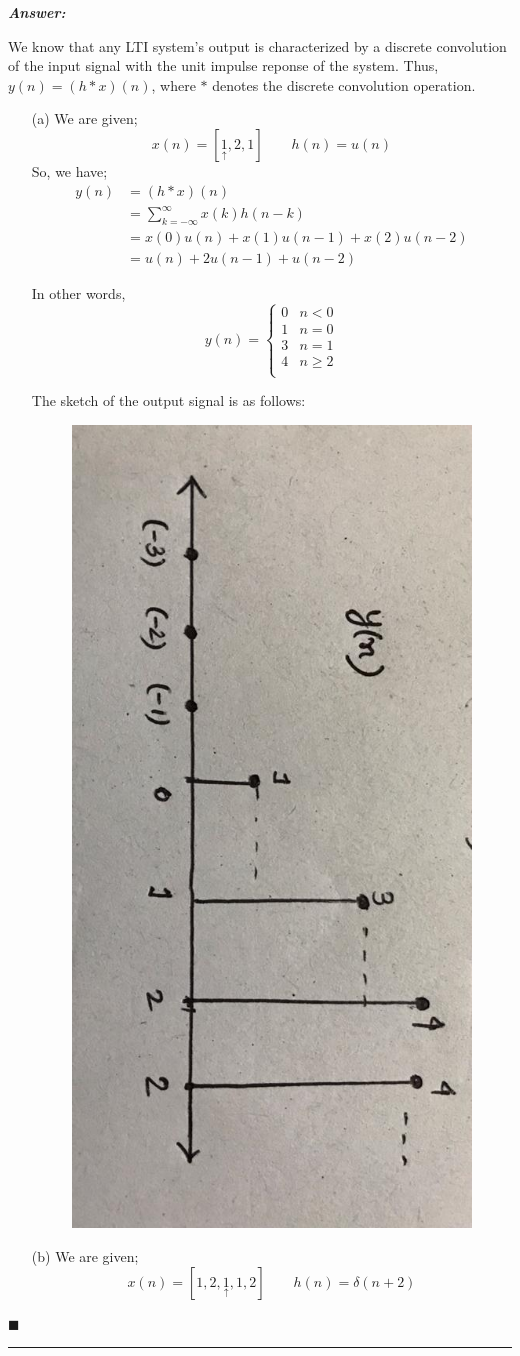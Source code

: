 \documentclass[12pt]{article}
\theoremstyle{definition}
\newenvironment{answer}{
    \textbf{\textit{Answer:}} \qquad
}{\hfill $\blacksquare$ \\ \begin{center}
    \rule{0.6\linewidth}{0.5px}    
\end{center}
}
\begin{document}
\begin{answer}
    We know that any LTI system's output is characterized by a discrete convolution of the input signal with the unit impulse reponse of the system. Thus, $y(n) = (h \ast x)(n)$, where $\ast$ denotes the discrete convolution operation.
    \begin{enumerate}
        \item[(a)] We are given;
        $$
        x(n) = [\underset{\uparrow}{1}, 2, 1] \qquad h(n) = u(n)
        $$ 
        So, we have;
        \begin{align*}
            y(n) 
            & = (h \ast x)(n) \\
            & = \sum_{k = -\infty}^{\infty} x(k)h(n-k)\\
            & = x(0)u(n) + x(1)u(n-1) + x(2)u(n-2)\\
            & = u(n) + 2u(n-1) + u(n-2)
        \end{align*} 

        In other words,
        $$
        y(n) = \begin{cases}
            0 & n < 0\\
            1 & n = 0\\
            3 & n = 1\\
            4 & n \geq 2\\
        \end{cases}
        $$

        The sketch of the output signal is as follows:

        \begin{figure}[H]
            \centering
            \includegraphics[height = 0.5\linewidth, angle = 90]{q7_a.jpeg}
        \end{figure}

        \item[(b)] We are given;
        $$
        x(n) = [1, 2, \underset{\uparrow}{1}, 1, 2] \qquad h(n) = \delta(n+2)
        $$


\end{enumerate}
\end{answer}
\end{document}
